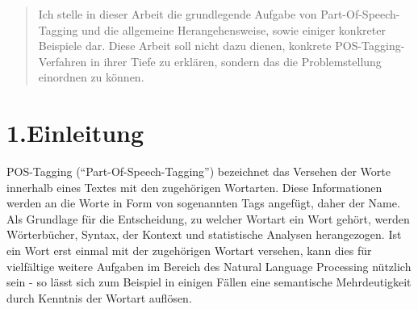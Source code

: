 \documentclass{article}
\begin{document}
\aclfinalcopy

\mdxtitleblockstart{}

\mdxauthorstart{}


\mdxauthorend
\mdtitleauthorrunning{}{}\mdxtitleblockend%

\noindent{}\newpage{}%

\begin{abstract}%

\noindent{}\mdbr
{}
Ich stelle in dieser Arbeit die grundlegende Aufgabe von Part-Of-Speech-Tagging und die allgemeine Herangehensweise, sowie einiger konkreter Beispiele dar.
Diese Arbeit soll nicht dazu dienen, konkrete POS-Tagging-Verfahren in ihrer Tiefe zu erklären, sondern das die Problemstellung einordnen zu können.%
\end{abstract}%

\section{1.\hspace*{0.5em}Einleitung}\label{sec-einleitung}%

\noindent{}POS-Tagging (\textquotedblleft{}Part-Of-Speech-Tagging\textquotedblright{}) bezeichnet das Versehen der Worte innerhalb eines Textes mit den zugehörigen Wortarten. Diese Informationen werden an die Worte in Form von sogenannten Tags angefügt, daher der Name.
Als Grundlage für die Entscheidung, zu welcher Wortart ein Wort gehört, werden Wörterbücher, Syntax, der Kontext und statistische Analysen herangezogen.
Ist ein Wort erst einmal mit der zugehörigen Wortart versehen, kann dies für vielfältige weitere Aufgaben im Bereich des Natural Language Processing nützlich sein - so lässt sich zum Beispiel in einigen Fällen eine semantische Mehrdeutigkeit durch Kenntnis der Wortart auflösen.%
\end{document}
